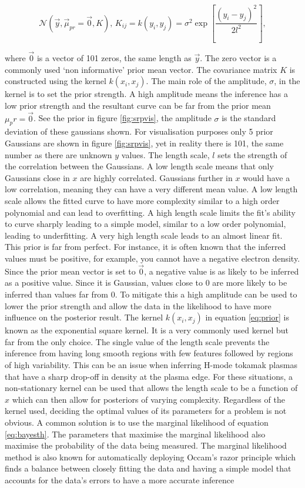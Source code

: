 \begin{equation}
  \mathcal{N}(\vec{y}, \vec \mu_{pr} = \vec{0}, K), \, K_{ij} = k(y_i, y_j) = \sigma^2 \exp\left[{\frac{(y_i - y_j)^2}{2l^2}}\right], 
  \label{eq:prior}
\end{equation}

\noindent where $\vec 0$ is a vector of 101 zeros, the same length as $\vec y$. The zero vector is a commonly used `non informative' prior mean vector. The covariance matrix $K$ is constructed using the kernel $k(x_i,x_j)$. The main role of the amplitude, $\sigma$, in the kernel is to set the prior strength. A high amplitude means the inference has a low prior strength and the resultant curve can be far from the prior mean $\mu_pr = \vec 0$. See the prior in figure \ref{fig:srpvis}, the amplitude $\sigma$ is the standard deviation of these gaussians shown. For visualisation purposes only 5 prior Gaussians are shown in figure \ref{fig:srpvis}, yet in reality there is 101, the same number as there are unknown $y$ values. The length scale, $l$ sets the strength of the correlation between the Gaussians. A low length scale means that only Gaussians close in $x$ are highly correlated. Gaussians further in $x$ would have a low correlation, meaning they can have a very different mean value. A low length scale allows the fitted curve to have more complexity similar to a high order polynomial and can lead to overfitting. A high length scale limits the fit's ability to curve sharply leading to a simple model, similar to a low order polynomial, leading to underfitting. A very high length scale leads to an almost linear fit. This prior is far from perfect. For instance, it is often known that the inferred values must be positive, for example, you cannot have a negative electron density. Since the prior mean vector is set to $\vec{0}$, a negative value is as likely to be inferred as a positive value. Since it is Gaussian, values close to 0 are more likely to be inferred than values far from 0. To mitigate this a high amplitude can be used to lower the prior strength and allow the data in the likelihood to have more influence on the posterior result. The kernel $k(x_i,x_j)$ in equation \ref{eq:prior} is known as the exponential square kernel. It is a very commonly used kernel but far from the only choice. The single value of the length scale prevents the inference from having long smooth regions with few features followed by regions of high variability. This can be an issue when inferring H-mode tokamak plasmas that have a sharp drop-off in density at the plasma edge. For these situations, a non-stationary kernel can be used that allows the length scale to be a function of $x$ which can then allow for posteriors of varying complexity. Regardless of the kernel used, deciding the optimal values of its parameters for a problem is not obvious. A common solution is to use the marginal likelihood of equation \ref{eq:bayesth}. The parameters that maximise the marginal likelihood also maximise the probability of the data being measured. The marginal likelihood method is also known for automatically deploying Occam's razor principle which finds a balance between closely fitting the data and having a simple model that accounts for the data's errors to have a more accurate inference 